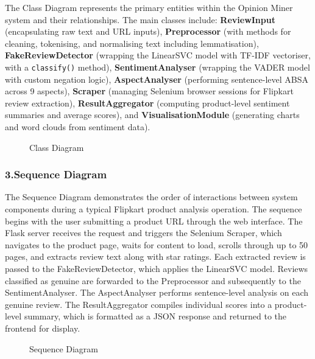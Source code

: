 \documentclass[12pt,a4paper]{report}
\begin{document}
The Class Diagram represents the primary entities within the Opinion Miner system and their relationships. The main classes include: \textbf{ReviewInput} (encapsulating raw text and URL inputs), \textbf{Preprocessor} (with methods for cleaning, tokenising, and normalising text including lemmatisation), \textbf{FakeReviewDetector} (wrapping the LinearSVC model with TF-IDF vectoriser, with a \texttt{classify()} method), \textbf{SentimentAnalyser} (wrapping the VADER model with custom negation logic), \textbf{AspectAnalyser} (performing sentence-level ABSA across 9 aspects), \textbf{Scraper} (managing Selenium browser sessions for Flipkart review extraction), \textbf{ResultAggregator} (computing product-level sentiment summaries and average scores), and \textbf{VisualisationModule} (generating charts and word clouds from sentiment data).

\begin{figure}[H]
\centering
{}
\caption{Class Diagram}
\label{fig:class}
\end{figure}

\subsubsection*{3.\quad Sequence Diagram}

The Sequence Diagram demonstrates the order of interactions between system components during a typical Flipkart product analysis operation. The sequence begins with the user submitting a product URL through the web interface. The Flask server receives the request and triggers the Selenium Scraper, which navigates to the product page, waits for content to load, scrolls through up to 50 pages, and extracts review text along with star ratings. Each extracted review is passed to the FakeReviewDetector, which applies the LinearSVC model. Reviews classified as genuine are forwarded to the Preprocessor and subsequently to the SentimentAnalyser. The AspectAnalyser performs sentence-level analysis on each genuine review. The ResultAggregator compiles individual scores into a product-level summary, which is formatted as a JSON response and returned to the frontend for display.

\begin{figure}[H]
\centering
{}
\caption{Sequence Diagram}
\label{fig:sequence}
\end{figure}
\end{document}
